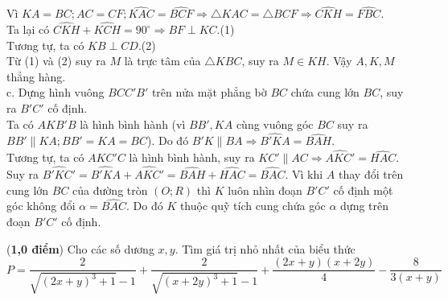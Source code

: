 \begin{ex}
{Vì $KA=BC;AC=CF;\widehat{KAC}=\widehat{BCF}\Rightarrow \triangle KAC=\triangle BCF\Rightarrow \widehat{CKH}=\widehat{FBC}$. \\
Ta lại có $\widehat{CKH}+\widehat{KCH}=90^\circ\Rightarrow BF\perp KC$.\hfill(1)\\
Tương tự, ta có $KB\perp CD$.\hfill(2)\\
Từ (1) và (2) suy ra $M$ là trực tâm của $\triangle KBC$, suy ra $M\in KH$. Vậy $A,K,M$ thẳng hàng.\\
c. Dựng hình vuông $BCC'B'$ trên nửa mặt phẳng bờ $BC$ chứa cung lớn $BC$, suy ra $B'C'$ cố định.\\
Ta có $AKB'B$ là hình bình hành (vì $BB', KA$ cùng vuông góc $BC$ suy ra $BB'\parallel KA; BB'=KA=BC$). Do đó $B'K\parallel BA\Rightarrow \widehat{B'KA}=\widehat{BAH}$.\\
Tương tự, ta có $AKC'C$ là hình bình hành, suy ra $KC'\parallel AC\Rightarrow \widehat{AKC'}=\widehat{HAC}$.\\
Suy ra $\widehat{B'KC'}=\widehat{B'KA}+\widehat{AKC'}=\widehat{BAH}+\widehat{HAC}=\widehat{BAC}$. Vì khi $A$ thay đổi trên cung lớn $BC$ của đường tròn $(O;R)$ thì $K$ luôn nhìn đoạn $B'C'$ cố định một góc không đổi $\alpha=\widehat{BAC}$. Do đó $K$ thuộc quỹ tích cung chứa góc $\alpha$ dựng trên đoạn $B'C'$ cố định.
}
\end{ex}

\begin{ex}
(\textbf{1,0 điểm})
Cho các số dương $x,y$. Tìm giá trị nhỏ nhất của biểu thức $$P=\dfrac{2}{\sqrt{(2x+y)^3+1}-1}+\dfrac{2}{\sqrt{(x+2y)^3+1}-1}+\dfrac{(2x+y)(x+2y)}{4}-\dfrac{8}{3(x+y)}$$
\end{ex}
